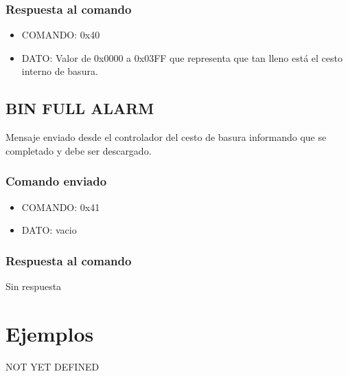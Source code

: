 \documentclass[a4paper,10pt]{article}
\begin{document}
\subsubsection*{Respuesta al comando}

\begin{itemize}
	\item{COMANDO:} 0x40
	\item{DATO:} Valor de 0x0000 a 0x03FF que representa que tan lleno est\'a el cesto interno de basura.
\end{itemize}

\subsection{BIN FULL ALARM}
\label{bin_full_alarm}

Mensaje enviado desde el controlador del cesto de basura informando que se completado y debe ser descargado.

\subsubsection*{Comando enviado}

\begin{itemize}
	\item{COMANDO:} 0x41
	\item{DATO:} vacio
\end{itemize}

\subsubsection*{Respuesta al comando}

Sin respuesta


\section{Ejemplos}
\label{ejemplos}

NOT YET DEFINED
\end{document}
